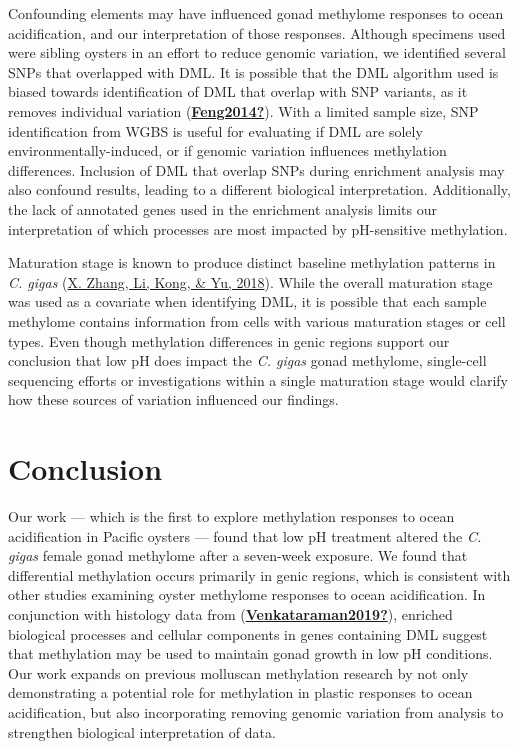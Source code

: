 \documentclass [11pt, proquest] {uwthesis}[2015/03/03]
\begin{document}
Confounding elements may have influenced gonad methylome responses to ocean acidification, and our interpretation of those responses. Although specimens used were sibling oysters in an effort to reduce genomic variation, we identified several SNPs that overlapped with DML. It is possible that the DML algorithm used is biased towards identification of DML that overlap with SNP variants, as it removes individual variation (\protect\hyperlink{ref-Feng2014}{\textbf{Feng2014?}}). With a limited sample size, SNP identification from WGBS is useful for evaluating if DML are solely environmentally-induced, or if genomic variation influences methylation differences. Inclusion of DML that overlap SNPs during enrichment analysis may also confound results, leading to a different biological interpretation. Additionally, the lack of annotated genes used in the enrichment analysis limits our interpretation of which processes are most impacted by pH-sensitive methylation.

Maturation stage is known to produce distinct baseline methylation patterns in \emph{C. gigas} (\protect\hyperlink{ref-Zhang2018}{X. Zhang, Li, Kong, \& Yu, 2018}). While the overall maturation stage was used as a covariate when identifying DML, it is possible that each sample methylome contains information from cells with various maturation stages or cell types. Even though methylation differences in genic regions support our conclusion that low pH does impact the \emph{C. gigas} gonad methylome, single-cell sequencing efforts or investigations within a single maturation stage would clarify how these sources of variation influenced our findings.

\hypertarget{conclusion-2}{%
\section{Conclusion}\label{conclusion-2}}

Our work --- which is the first to explore methylation responses to ocean acidification in Pacific oysters --- found that low pH treatment altered the \emph{C. gigas} female gonad methylome after a seven-week exposure. We found that differential methylation occurs primarily in genic regions, which is consistent with other studies examining oyster methylome responses to ocean acidification. In conjunction with histology data from (\protect\hyperlink{ref-Venkataraman2019}{\textbf{Venkataraman2019?}}), enriched biological processes and cellular components in genes containing DML suggest that methylation may be used to maintain gonad growth in low pH conditions. Our work expands on previous molluscan methylation research by not only demonstrating a potential role for methylation in plastic responses to ocean acidification, but also incorporating removing genomic variation from analysis to strengthen biological interpretation of data.
\end{document}
